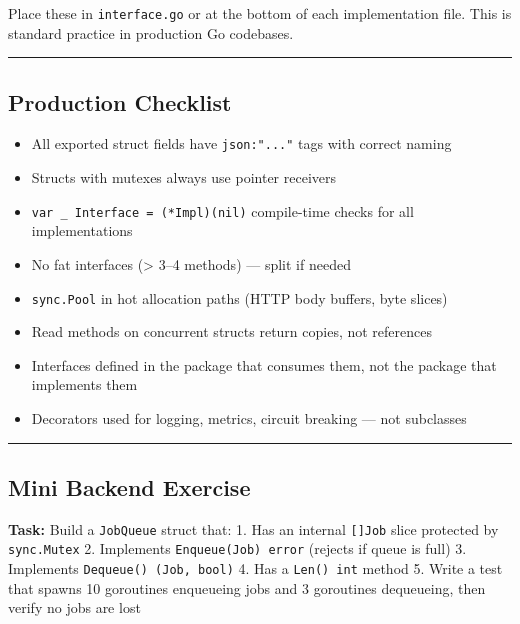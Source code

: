 \documentclass[11pt,openany]{book}
\providecommand{\tightlist}{%
  \setlength{\itemsep}{0pt}\setlength{\parskip}{0pt}}
\begin{document}
Place these in \texttt{interface.go} or at the bottom of each
implementation file. This is standard practice in production Go
codebases.

\begin{center}\rule{0.5\linewidth}{0.5pt}\end{center}

\hypertarget{production-checklist-2}{%
\subsection{Production Checklist}\label{production-checklist-2}}

\begin{itemize}
\tightlist
\item[$\square$]
  All exported struct fields have \texttt{json:"..."} tags with correct
  naming
\item[$\square$]
  Structs with mutexes always use pointer receivers
\item[$\square$]
  \texttt{var\ \_\ Interface\ =\ (*Impl)(nil)} compile-time checks for
  all implementations
\item[$\square$]
  No fat interfaces (\textgreater{} 3--4 methods) --- split if needed
\item[$\square$]
  \texttt{sync.Pool} in hot allocation paths (HTTP body buffers, byte
  slices)
\item[$\square$]
  Read methods on concurrent structs return copies, not references
\item[$\square$]
  Interfaces defined in the package that consumes them, not the package
  that implements them
\item[$\square$]
  Decorators used for logging, metrics, circuit breaking --- not
  subclasses
\end{itemize}

\begin{center}\rule{0.5\linewidth}{0.5pt}\end{center}

\hypertarget{mini-backend-exercise-2}{%
\subsection{Mini Backend Exercise}\label{mini-backend-exercise-2}}

\textbf{Task:} Build a \texttt{JobQueue} struct that: 1. Has an internal
\texttt{{[}{]}Job} slice protected by \texttt{sync.Mutex} 2. Implements
\texttt{Enqueue(Job)\ error} (rejects if queue is full) 3. Implements
\texttt{Dequeue()\ (Job,\ bool)} 4. Has a \texttt{Len()\ int} method 5.
Write a test that spawns 10 goroutines enqueueing jobs and 3 goroutines
dequeueing, then verify no jobs are lost
\end{document}
